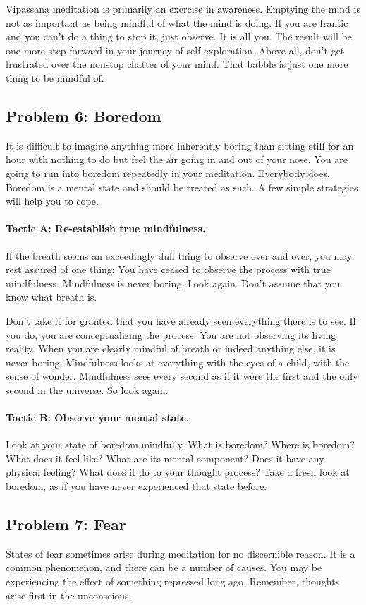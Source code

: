 Vipassana meditation is primarily an exercise in awareness. Emptying the mind is
not as important as being mindful of what the mind is doing. If you are frantic
and you can't do a thing to stop it, just observe. It is all you. The result
will be one more step forward in your journey of self-exploration. Above all,
don't get frustrated over the nonstop chatter of your mind. That babble is just
one more thing to be mindful of.

\subsection{Problem 6: Boredom}
It is difficult to imagine anything more inherently boring than sitting still for an hour with nothing to do but feel the air going in
and out of your nose. You are going to run into boredom repeatedly in your meditation. Everybody does. Boredom is a mental
state and should be treated as such. A few simple strategies will help you to cope.

\paragraph*{Tactic A: Re-establish true mindfulness.} If the breath seems an exceedingly dull
thing to observe over and over, you may rest assured of one thing: You have
ceased to observe the process with true mindfulness. Mindfulness is never
boring. Look again. Don't assume that you know what breath is.

Don't take it for granted that you have already seen everything there is to see.
If you do, you are conceptualizing the process. You are not observing its living
reality. When you are clearly mindful of breath or indeed anything else, it is
never boring. Mindfulness looks at everything with the eyes of a child, with the
sense of wonder. Mindfulness sees every second as if it were the first and the
only second in the universe. So look again.

\paragraph*{Tactic B: Observe your mental state.} Look at your state of boredom mindfully.
What is boredom? Where is boredom? What does it feel like? What are its mental
component? Does it have any physical feeling? What does it do to your thought
process? Take a fresh look at boredom, as if you have never experienced that
state before.

\subsection*{Problem 7: Fear} States of fear sometimes arise during meditation for no
discernible reason. It is a common phenomenon, and there can be a number of
causes. You may be experiencing the effect of something repressed long ago.
Remember, thoughts arise first in the unconscious.

